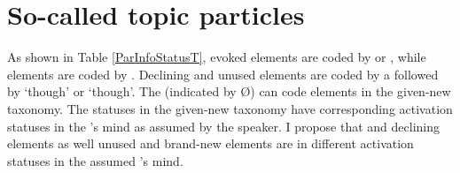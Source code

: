 \section{So-called topic particles}\label{TopPar}

As shown in Table \ref{ParInfoStatusT},
evoked elements are coded by  or ,
while  elements are coded by .
Declining and unused elements are coded by a  followed by  `though' or  `though'.
The  (indicated by {\O}) can code elements in the given-new taxonomy.
The statuses in the given-new taxonomy have corresponding activation statuses in the 's mind as assumed by the speaker.
I propose that  and declining elements as well unused and brand-new elements are in different activation statuses in the assumed 's mind.

